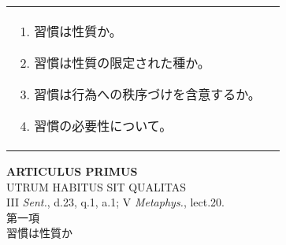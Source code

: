 \documentclass[10pt]{jsarticle} %
\begin{document}
\begin{longtable}{p{21em}p{21em}}
\begin{enumerate}
 \item 習慣は性質か。
 \item 習慣は性質の限定された種か。
 \item 習慣は行為への秩序づけを含意するか。
 \item 習慣の必要性について。
\end{enumerate}




\end{longtable}

\newpage
{}
\begin{center}
{\Large {\bf ARTICULUS PRIMUS}}\\
{\large UTRUM HABITUS SIT QUALITAS}\\
{\footnotesize III {\itshape Sent.}, d.23, q.1, a.1; V {\itshape
 Metaphys.}, lect.20.}\\
{\Large 第一項\\習慣は性質か}
\end{center}
\end{document}
